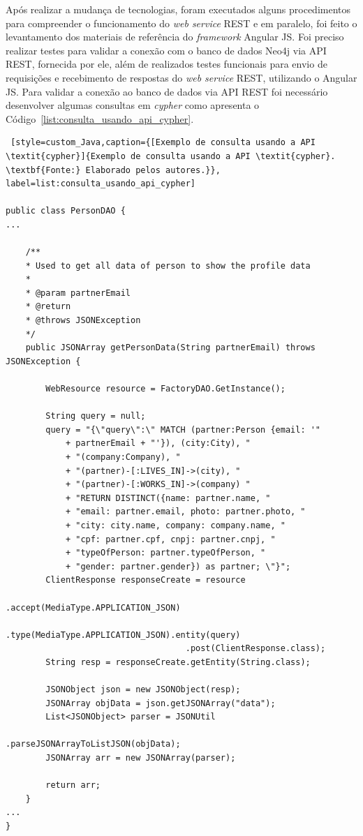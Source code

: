 
\par Após realizar a mudança de tecnologias, foram executados alguns procedimentos para compreender o funcionamento do \textit{web service} REST e em paralelo, foi feito o levantamento dos materiais de referência do \textit{framework} Angular JS. Foi preciso realizar testes para validar a conexão com o banco de dados Neo4j via API REST, fornecida por ele, além de realizados testes funcionais para envio de requisições e recebimento de respostas do \textit{web service} REST, utilizando o Angular JS. Para validar a conexão ao banco de dados via API REST foi necessário desenvolver algumas consultas em \textit{cypher} como apresenta o Código~\ref{list:consulta_usando_api_cypher}.

\begin{lstlisting} [style=custom_Java,caption={[Exemplo de consulta usando a API \textit{cypher}]{Exemplo de consulta usando a API \textit{cypher}. \textbf{Fonte:} Elaborado pelos autores.}}, label=list:consulta_usando_api_cypher] 	

public class PersonDAO {
...

	/**
	* Used to get all data of person to show the profile data
	* 
	* @param partnerEmail
	* @return
	* @throws JSONException 
	*/
	public JSONArray getPersonData(String partnerEmail) throws JSONException {
		
		WebResource resource = FactoryDAO.GetInstance();
		
		String query = null;
		query = "{\"query\":\" MATCH (partner:Person {email: '"
			+ partnerEmail + "'}), (city:City), "
			+ "(company:Company), "
			+ "(partner)-[:LIVES_IN]->(city), "
			+ "(partner)-[:WORKS_IN]->(company) "
			+ "RETURN DISTINCT({name: partner.name, "
			+ "email: partner.email, photo: partner.photo, " 
			+ "city: city.name, company: company.name, " 
			+ "cpf: partner.cpf, cnpj: partner.cnpj, " 
			+ "typeOfPerson: partner.typeOfPerson, " 
			+ "gender: partner.gender}) as partner; \"}";
		ClientResponse responseCreate = resource
									.accept(MediaType.APPLICATION_JSON)
									.type(MediaType.APPLICATION_JSON).entity(query)
									.post(ClientResponse.class);
		String resp = responseCreate.getEntity(String.class);
		
		JSONObject json = new JSONObject(resp);
		JSONArray objData = json.getJSONArray("data");
		List<JSONObject> parser = JSONUtil
												.parseJSONArrayToListJSON(objData);
		JSONArray arr = new JSONArray(parser);
		
		return arr;
	}
...
}
\end{lstlisting}

